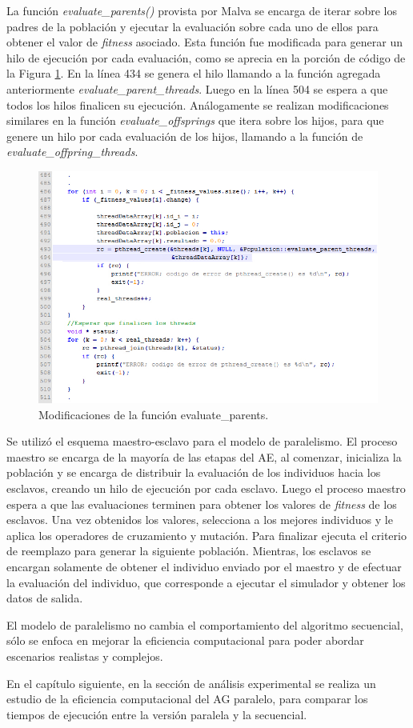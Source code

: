 La función \emph{evaluate{\_}parents()} provista por Malva se encarga de iterar sobre los padres de la población y ejecutar la evaluación sobre cada uno de ellos para obtener el valor de \emph{fitness} asociado. Esta función fue modificada para generar un hilo de ejecución por cada evaluación, como se aprecia en la porción de código de la Figura \ref{fig:codigo2}.
En la línea 434  se genera el hilo llamando a la función agregada anteriormente \emph{evaluate{\_}parent{\_}threads}. Luego en la línea 504 se espera a que todos los hilos finalicen su ejecución. Análogamente se realizan modificaciones similares en la función 	\emph{evaluate{\_}offsprings }que itera sobre los hijos, para que genere un hilo por cada evaluación de los hijos, llamando a la función de  \emph{evaluate{\_}offpring{\_}threads}.
		
\begin{figure}[H]
	\centering
	\includegraphics[width=1\linewidth]{Figures/codigo2}
	\caption{Modificaciones de la función evaluate{\_}parents.}
	\label{fig:codigo2}
\end{figure}		

Se utilizó el esquema maestro-esclavo para el modelo de paralelismo. El proceso maestro se encarga de la mayoría de las etapas del AE, al comenzar, inicializa la población y se encarga de distribuir la evaluación de los individuos hacia los esclavos, creando un hilo de ejecución por cada esclavo. Luego el proceso maestro espera a que las evaluaciones terminen para obtener los valores de \emph{fitness} de los esclavos. Una vez obtenidos los valores, selecciona a los mejores individuos y le aplica los operadores de cruzamiento y mutación. Para finalizar ejecuta el criterio de reemplazo para generar la siguiente población. Mientras, los esclavos se encargan solamente de obtener el individuo enviado por el maestro y de efectuar la evaluación del individuo, que corresponde a ejecutar el simulador y obtener los datos de salida. 


El modelo de paralelismo no cambia el comportamiento del algoritmo secuencial, sólo se enfoca en mejorar la eficiencia computacional para poder abordar escenarios realistas y complejos.

En el capítulo siguiente, en la sección de análisis experimental se realiza un estudio de la eficiencia computacional del AG paralelo, para comparar los tiempos de ejecución entre la versión paralela y la secuencial.